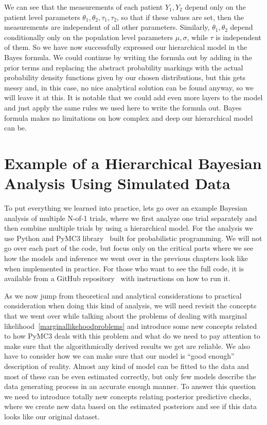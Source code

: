 \documentclass[12pt,a4paper,leqno]{report}
\theoremstyle{plain}
\theoremstyle{definition}
\theoremstyle{remark}
\begin{document}
We can see that the measurements of each patient \(Y_1, Y_2\) depend only on the patient
level parameters \(\theta_1, \theta_2, \tau_1, \tau_2\), so that if these values are set, then the
measurements are independent of all other parameters. Similarly, \(\theta_1, \theta_2 \) depend conditionally only
on the population level parameters \(\mu, \sigma \), while \(\tau \) is independent of them. So we have now successfully
expressed our hierarchical model in the Bayes formula. We could continue by writing the
formula out by adding in the prior terms and replacing the abstract probability
markings with the actual probability density functions given by our chosen
distributions, but this gets messy and, in this case, no nice analytical solution can be
found anyway, so we will leave it at this. It is notable that we could add even
more layers to the model and just apply the same rules we used here to write the formula
out. Bayes formula makes no limitations on how complex and deep our hierarchical model
can be.


\chapter{Example of a Hierarchical Bayesian Analysis Using Simulated Data}

To put everything we learned into practice, lets go over an example Bayesian
analysis of multiple N-of-1 trials, where we first analyze one trial separately and then
combine multiple trials by using a hierarchical model. For the analysis we use Python and PyMC3 library\ \cite{pymc3} built
for probabilistic programming. We will not go over each part of the code, but focus only
on the critical parts where we see how the models and inference we went over in the
previous chapters look like when implemented in practice. For those who want to see the
full code, it is available from a GitHub repository\ \cite{github} with instructions on how
to run it.

As we now jump from theoretical and analytical considerations to practical consideration
when doing this kind of analysis, we will need revisit the concepts that we went over
while talking about the problems of dealing with marginal likelihood\
\ref{marginallikehoodproblems} and introduce some new concepts related to how
PyMC3 deals with this problem and what do we need to pay attention to
make sure that the algorithmically derived results we get are reliable. We also have to
consider how we can make sure that our model is ``good enough'' description of reality.
Almost any kind of model can be fitted to the data and most of these can be even
estimated correctly, but only few models describe the data generating process in an
accurate enough manner. To answer this question we need to introduce totally new concepts
relating posterior predictive checks, where we create new data based on the estimated
posteriors and see if this data looks like our original dataset.
\end{document}
